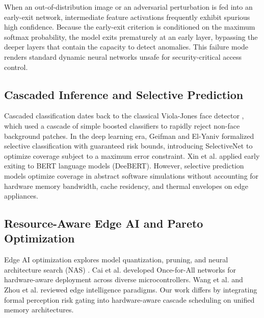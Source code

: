 \documentclass[conference]{IEEEtran}
\begin{document}
When an out-of-distribution image or an adversarial perturbation is fed into an early-exit network, intermediate feature activations frequently exhibit spurious high confidence. Because the early-exit criterion is conditioned on the maximum softmax probability, the model exits prematurely at an early layer, bypassing the deeper layers that contain the capacity to detect anomalies. This failure mode renders standard dynamic neural networks unsafe for security-critical access control.

\subsection{Cascaded Inference and Selective Prediction}
Cascaded classification dates back to the classical Viola-Jones face detector \cite{b11}, which used a cascade of simple boosted classifiers to rapidly reject non-face background patches. In the deep learning era, Geifman and El-Yaniv \cite{b12, b13} formalized selective classification with guaranteed risk bounds, introducing SelectiveNet to optimize coverage subject to a maximum error constraint. Xin et al. \cite{b14} applied early exiting to BERT language models (DeeBERT). However, selective prediction models optimize coverage in abstract software simulations without accounting for hardware memory bandwidth, cache residency, and thermal envelopes on edge appliances.

\subsection{Resource-Aware Edge AI and Pareto Optimization}
Edge AI optimization explores model quantization, pruning, and neural architecture search (NAS) \cite{b15, b16}. Cai et al. \cite{b17} developed Once-for-All networks for hardware-aware deployment across diverse microcontrollers. Wang et al. \cite{b18} and Zhou et al. \cite{b2} reviewed edge intelligence paradigms. Our work differs by integrating formal perception risk gating into hardware-aware cascade scheduling on unified memory architectures.

\begin{table}[htbp]
\caption{Comparative Taxonomy of Dynamic Edge Inference Paradigms}
\centering
{}
\label{tab:p23_taxonomy}
\end{table}
\end{document}
